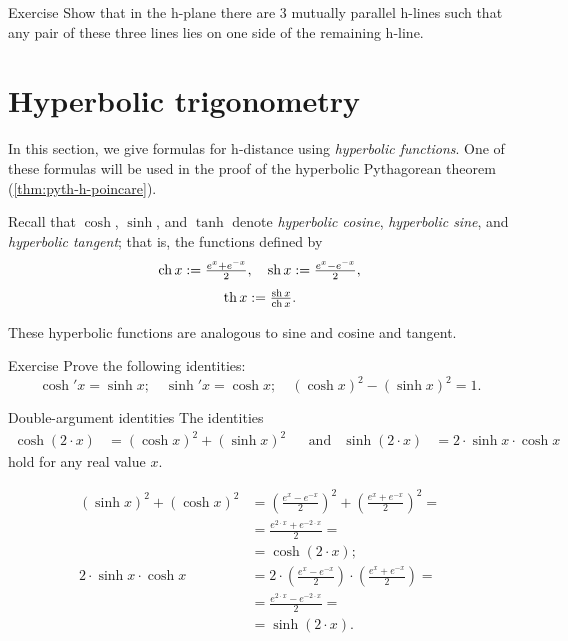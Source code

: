 \begin{thm}{Exercise}\label{ex:3-h-lines}
Show that in the h-plane 
there are 3 mutually parallel h-lines 
such that any pair of these three lines lies on one side of the remaining h-line.
\end{thm}
 
\section{Hyperbolic trigonometry}
\label{sec:hyp-trig}


In this section, we give formulas for h-distance using \emph{hyperbolic functions}.
One of these formulas will be used in the proof of the hyperbolic Pythagorean theorem (\ref{thm:pyth-h-poincare}).

Recall that $\cosh$, $\sinh$, and $\tanh$ denote \emph{hyperbolic cosine}, \emph{hyperbolic sine}, and \emph{hyperbolic tangent}\label{hyperbolic tangent};
that is, the functions defined by
\[\operatorname{ch} x:= \tfrac{e^x+e^{-x}}2,
 \quad
 \operatorname{sh} x:= \tfrac{e^x-e^{-x}}2,
\]
\[\operatorname{th} x:= \tfrac{\operatorname{sh} x}{\operatorname{ch} x}.
\]

These hyperbolic functions are analogous to sine and cosine and tangent. 

\begin{thm}{Exercise}\label{ex:hyp-fun}
Prove the following identities:
\[\cosh' x=\sinh x;\quad \sinh'x=\cosh x;\quad (\cosh x)^2-(\sinh x)^2=1.\]
\end{thm}

\begin{thm}{Double-argument identities}\label{double-argument}
The identities
\begin{align*}
\cosh (2\cdot x)&=(\cosh x)^2+(\sinh x)^2 
&&\text{and}&
\sinh (2\cdot x)&=2\cdot\sinh x\cdot \cosh x
\end{align*}
hold for any real value $x$.
\end{thm}

\begin{align*}
(\sinh x)^2+(\cosh x)^2
&=(\tfrac{e^x-e^{-x}}2)^2+(\tfrac{e^x+e^{-x}}2)^2=
\\
&=\tfrac{e^{2\cdot x}+e^{-2\cdot x}}2=
\\
&=\cosh (2\cdot x);
\\
2\cdot\sinh x\cdot \cosh x
&=2\cdot(\tfrac{e^x-e^{-x}}2)\cdot(\tfrac{e^x+e^{-x}}2)=
\\
&=\tfrac{e^{2\cdot x}-e^{-2\cdot x}}2=
\\
&=\sinh (2\cdot x).
\end{align*}
\qedsf


